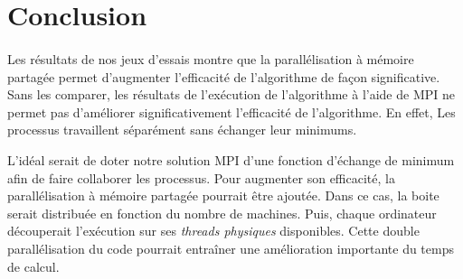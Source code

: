 \documentclass[a4paper]{article}
\begin{document}
\section{Conclusion}
    \paragraph{}
    Les résultats de nos jeux d'essais montre que la parallélisation à mémoire partagée permet d'augmenter l'efficacité de l'algorithme de façon significative. Sans les comparer, les résultats de l'exécution de l'algorithme à l'aide de MPI ne permet pas d'améliorer significativement l'efficacité de l'algorithme. En effet, Les processus travaillent séparément sans échanger leur minimums.
    
    L'idéal serait de doter notre solution MPI d'une fonction d’échange de minimum afin de faire collaborer les processus. Pour augmenter son efficacité, la parallélisation à mémoire partagée pourrait être ajoutée. Dans ce cas, la boite serait distribuée en fonction du nombre de machines. Puis, chaque ordinateur découperait l'exécution sur ses \emph{threads physiques} disponibles. Cette double parallélisation du code pourrait entraîner une amélioration importante du temps de calcul.
    
    
\end{document}
